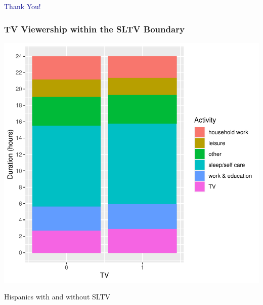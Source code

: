 \documentclass{beamer}
\begin{document}
		
\begin{frame}
\Large \centering \textcolor{darkblue}{Thank You!}
\end{frame}



\begin{frame}
\frametitle{TV Viewership within the SLTV Boundary} \label{atus_breakdown}

\begin{center}
\includegraphics[width=.75\textwidth]{../../analysis/Output/graphs/time_breakdown.pdf}\\
\end{center}
\vspace{-5pt}
\footnotesize Hispanics with and without SLTV \hyperlink{atus_time}{}

\end{frame}
\end{document}
